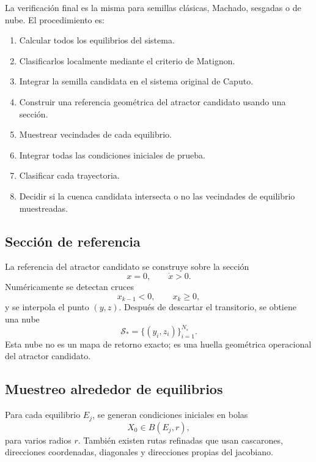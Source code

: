 \documentclass[11pt]{article}
\begin{document}
La verificación final es la misma para semillas clásicas, Machado, sesgadas o de nube. El procedimiento es:
\begin{enumerate}[label=\arabic*.]
\item Calcular todos los equilibrios del sistema.
\item Clasificarlos localmente mediante el criterio de Matignon.
\item Integrar la semilla candidata en el sistema original de Caputo.
\item Construir una referencia geométrica del atractor candidato usando una sección.
\item Muestrear vecindades de cada equilibrio.
\item Integrar todas las condiciones iniciales de prueba.
\item Clasificar cada trayectoria.
\item Decidir si la cuenca candidata intersecta o no las vecindades de equilibrio muestreadas.
\end{enumerate}

\subsection{Sección de referencia}

La referencia del atractor candidato se construye sobre la sección
\begin{equation}
x=0,
\qquad
\dot x>0.
\end{equation}
Numéricamente se detectan cruces
\begin{equation}
x_{k-1}<0,
\qquad
x_k\geq 0,
\end{equation}
y se interpola el punto \((y,z)\). Después de descartar el transitorio, se obtiene una nube
\begin{equation}
\mathcal S_*=\{(y_i,z_i)\}_{i=1}^{N_s}.
\end{equation}
Esta nube no es un mapa de retorno exacto; es una huella geométrica operacional del atractor candidato.

\subsection{Muestreo alrededor de equilibrios}

Para cada equilibrio \(E_j\), se generan condiciones iniciales en bolas
\begin{equation}
X_0\in B(E_j,r),
\end{equation}
para varios radios \(r\). También existen rutas refinadas que usan cascarones, direcciones coordenadas, diagonales y direcciones propias del jacobiano.
\end{document}
